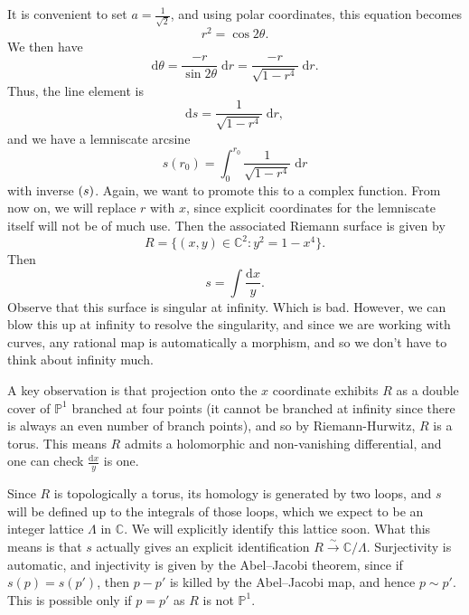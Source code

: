 \documentclass{shortart}
\theoremstyle{definition}
\newcommand\C{\mathbb{C}}
\renewcommand\P{\mathbb{P}}
\renewcommand\d{\mathrm{d}}
\let\sl\relax
\DeclareMathOperator\sl{sl}
\begin{document}
It is convenient to set $a = \frac{1}{\sqrt{2}}$, and using polar coordinates, this equation becomes
\[
  r^2 = \cos 2\theta.
\]
We then have
\[
  \d \theta = \frac{-r}{\sin 2\theta}\;\d r = \frac{-r}{\sqrt{1 - r^4}}\;\d r.
\]
Thus, the line element is
\[
  \d s = \frac{1}{\sqrt{1 - r^4}}\;\d r,
\]
and we have a lemniscate arcsine
\[
  s(r_0) = \int_0^{r_0} \frac{1}{\sqrt{1 - r^4}}\;\d r
\]
with inverse $\sl(s)$. Again, we want to promote this to a complex function. From now on, we will replace $r$ with $x$, since explicit coordinates for the lemniscate itself will not be of much use. Then the associated Riemann surface is given by
\[
  R = \{(x, y) \in \C^2: y^2 = 1 - x^4\}.
\]
Then
\[
  s = \int \frac{\d x}{y}.
\]
Observe that this surface is singular at infinity. Which is bad. However, we can blow this up at infinity to resolve the singularity, and since we are working with curves, any rational map is automatically a morphism, and so we don't have to think about infinity much.

A key observation is that projection onto the $x$ coordinate exhibits $R$ as a double cover of $\P^1$ branched at four points (it cannot be branched at infinity since there is always an even number of branch points), and so by Riemann-Hurwitz, $R$ is a torus. This means $R$ admits a holomorphic and non-vanishing differential, and one can check $\frac{\d x}{y}$ is one.

Since $R$ is topologically a torus, its homology is generated by two loops, and $s$ will be defined up to the integrals of those loops, which we expect to be an integer lattice $\Lambda$ in $\C$. We will explicitly identify this lattice soon. What this means is that $s$ actually gives an explicit identification $R \overset{\sim}{\to} \C/\Lambda$. Surjectivity is automatic, and injectivity is given by the Abel--Jacobi theorem, since if $s(p) = s(p')$, then $p - p'$ is killed by the Abel--Jacobi map, and hence $p \sim p'$. This is possible only if $p = p'$ as $R$ is not $\P^1$.
\end{document}
